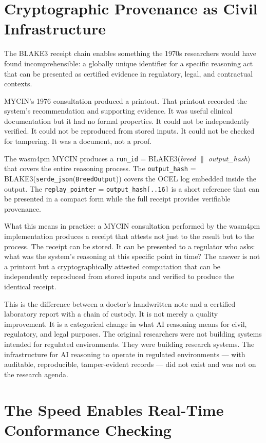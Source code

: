 \section{Cryptographic Provenance as Civil Infrastructure}
\label{sec:provenance}

The BLAKE3 receipt chain enables something the 1970s researchers would have found
incomprehensible: a globally unique identifier for a specific reasoning act that can be
presented as certified evidence in regulatory, legal, and contractual contexts.

MYCIN's 1976 consultation produced a printout. That printout recorded the system's
recommendation and supporting evidence. It was useful clinical documentation but it had no
formal properties. It could not be independently verified. It could not be reproduced from
stored inputs. It could not be checked for tampering. It was a document, not a proof.

The wasm4pm MYCIN produces a \texttt{run\_id} = BLAKE3(\textit{breed} $\|$ \textit{output\_hash})
that covers the entire reasoning process. The \texttt{output\_hash} =
BLAKE3(\texttt{serde\_json}(\texttt{BreedOutput})) covers the OCEL log embedded inside the
output. The \texttt{replay\_pointer} = \texttt{output\_hash[..16]} is a short reference that
can be presented in a compact form while the full receipt provides verifiable provenance.

What this means in practice: a MYCIN consultation performed by the wasm4pm implementation
produces a receipt that attests not just to the result but to the process. The receipt can
be stored. It can be presented to a regulator who asks: what was the system's reasoning at
this specific point in time? The answer is not a printout but a cryptographically attested
computation that can be independently reproduced from stored inputs and verified to produce
the identical receipt.

This is the difference between a doctor's handwritten note and a certified laboratory report
with a chain of custody. It is not merely a quality improvement. It is a categorical change
in what AI reasoning means for civil, regulatory, and legal purposes. The original researchers
were not building systems intended for regulated environments. They were building research
systems. The infrastructure for AI reasoning to operate in regulated environments --- with
auditable, reproducible, tamper-evident records --- did not exist and was not on the research
agenda.

\section{The Speed Enables Real-Time Conformance Checking}
\label{sec:realtime-conformance}

